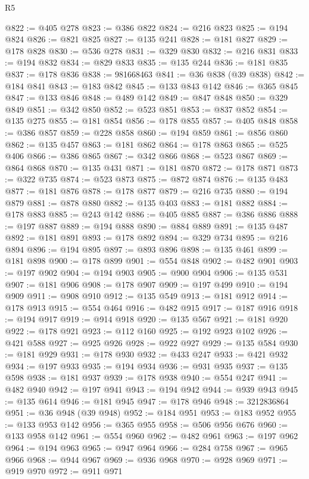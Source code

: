 \begin{lexlean}{R5}
\begin{coremodule}
@822 := @405 @278
@823 := @386 @822
@824 := @216 @823
@825 := @194 @824
@826 := @821 @825
@827 := @135 @241
@828 := @181 @827
@829 := @178 @828
@830 := @536 @278
@831 := @329 @830
@832 := @216 @831
@833 := @194 @832
@834 := @829 @833
@835 := @135 @244
@836 := @181 @835
@837 := @178 @836
@838 := 981668463
@841 := @36 @838 (@39 @838)
@842 := @184 @841
@843 := @183 @842
@845 := @133 @843 @142
@846 := @365 @845
@847 := @133 @846
@848 := @489 @142
@849 := @847 @848
@850 := @329 @849
@851 := @342 @850
@852 := @523 @851
@853 := @837 @852
@854 := @135 @275
@855 := @181 @854
@856 := @178 @855
@857 := @405 @848
@858 := @386 @857
@859 := @228 @858
@860 := @194 @859
@861 := @856 @860
@862 := @135 @457
@863 := @181 @862
@864 := @178 @863
@865 := @525 @406
@866 := @386 @865
@867 := @342 @866
@868 := @523 @867
@869 := @864 @868
@870 := @135 @431
@871 := @181 @870
@872 := @178 @871
@873 := @322 @735
@874 := @523 @873
@875 := @872 @874
@876 := @135 @483
@877 := @181 @876
@878 := @178 @877
@879 := @216 @735
@880 := @194 @879
@881 := @878 @880
@882 := @135 @403
@883 := @181 @882
@884 := @178 @883
@885 := @243 @142
@886 := @405 @885
@887 := @386 @886
@888 := @197 @887
@889 := @194 @888
@890 := @884 @889
@891 := @135 @487
@892 := @181 @891
@893 := @178 @892
@894 := @329 @734
@895 := @216 @894
@896 := @194 @895
@897 := @893 @896
@898 := @135 @461
@899 := @181 @898
@900 := @178 @899
@901 := @554 @848
@902 := @482 @901
@903 := @197 @902
@904 := @194 @903
@905 := @900 @904
@906 := @135 @531
@907 := @181 @906
@908 := @178 @907
@909 := @197 @499
@910 := @194 @909
@911 := @908 @910
@912 := @135 @549
@913 := @181 @912
@914 := @178 @913
@915 := @554 @464
@916 := @482 @915
@917 := @187 @916
@918 := @194 @917
@919 := @914 @918
@920 := @135 @567
@921 := @181 @920
@922 := @178 @921
@923 := @112 @160
@925 := @192 @923 @102
@926 := @421 @588
@927 := @925 @926
@928 := @922 @927
@929 := @135 @584
@930 := @181 @929
@931 := @178 @930
@932 := @433 @247
@933 := @421 @932
@934 := @197 @933
@935 := @194 @934
@936 := @931 @935
@937 := @135 @598
@938 := @181 @937
@939 := @178 @938
@940 := @554 @247
@941 := @482 @940
@942 := @197 @941
@943 := @194 @942
@944 := @939 @943
@945 := @135 @614
@946 := @181 @945
@947 := @178 @946
@948 := 3212836864
@951 := @36 @948 (@39 @948)
@952 := @184 @951
@953 := @183 @952
@955 := @133 @953 @142
@956 := @365 @955
@958 := @506 @956 @676
@960 := @133 @958 @142
@961 := @554 @960
@962 := @482 @961
@963 := @197 @962
@964 := @194 @963
@965 := @947 @964
@966 := @284 @758
@967 := @965 @966
@968 := @944 @967
@969 := @936 @968
@970 := @928 @969
@971 := @919 @970
@972 := @911 @971

\end{coremodule}
\end{lexlean}
